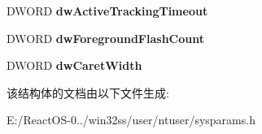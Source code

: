 \begin{DoxyCompactItemize}
\mbox{\label{struct___s_p_i_v_a_l_u_e_s_ab384f06098d45a816e8587305d5369ea}} 
D\+W\+O\+RD {\bfseries dw\+Active\+Tracking\+Timeout}
\item 
\mbox{\label{struct___s_p_i_v_a_l_u_e_s_ac49c7f33b5724c86604d12b0041694ce}} 
D\+W\+O\+RD {\bfseries dw\+Foreground\+Flash\+Count}
\item 
\mbox{\label{struct___s_p_i_v_a_l_u_e_s_a809226f204533a49f4ff14c1d9643668}} 
D\+W\+O\+RD {\bfseries dw\+Caret\+Width}
\end{DoxyCompactItemize}


该结构体的文档由以下文件生成\+:\begin{DoxyCompactItemize}
\item 
E\+:/\+React\+O\+S-\/0../win32ss/user/ntuser/sysparams.\+h\end{DoxyCompactItemize}
